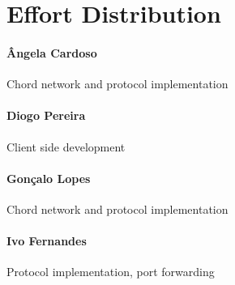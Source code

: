 \documentclass[11pt]{article}
\begin{document}
\section{Effort Distribution}

\paragraph{Ângela Cardoso}
Chord network and protocol implementation

\paragraph{Diogo Pereira}
Client side development

\paragraph{Gonçalo Lopes}
Chord network and protocol implementation

\paragraph{Ivo Fernandes}
Protocol implementation, port forwarding






\nocite{*}

\end{document}
